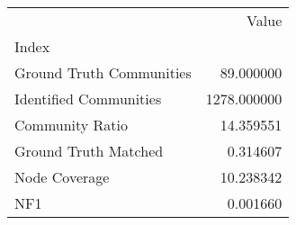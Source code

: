 \begin{tabular}{lr}
\toprule
{} &        Value \\
Index                    &              \\
\midrule
Ground Truth Communities &    89.000000 \\
Identified Communities   &  1278.000000 \\
Community Ratio          &    14.359551 \\
Ground Truth Matched     &     0.314607 \\
Node Coverage            &    10.238342 \\
NF1                      &     0.001660 \\
\bottomrule
\end{tabular}
